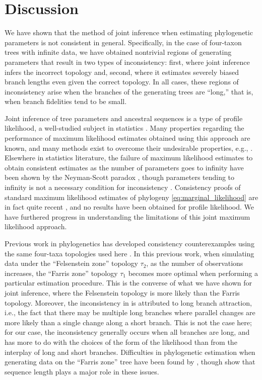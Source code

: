 \documentclass{article}
\begin{document}
\section*{Discussion}

We have shown that the method of joint inference when estimating phylogenetic parameters \cite{Sagulenko2017-jo} is not consistent in general.
Specifically, in the case of four-taxon trees with infinite data, we have obtained nontrivial regions of generating parameters that result in two types of inconsistency: first, where joint inference infers the incorrect topology and, second, where it estimates severely biased branch lengths even given the correct topology.
In all cases, these regions of inconsistency arise when the branches of the generating trees are ``long,'' that is, when branch fidelities tend to be small.

Joint inference of tree parameters and ancestral sequences is a type of profile likelihood, a well-studied subject in statistics \cite{Murphy2000-ry}.
Many properties regarding the performance of maximum likelihood estimates obtained using this approach are known, and many methods exist to overcome their undesirable properties, e.g., \cite{Geman1982}.
Elsewhere in statistics literature, the failure of maximum likelihood estimates to obtain consistent estimates as the number of parameters goes to infinity have been shown by the Neyman-Scott paradox \cite{Neyman1948-tt}, though parameters tending to infinity is not a necessary condition for inconsistency \cite{LeCam1990}.
Consistency proofs of standard maximum likelihood estimates of phylogeny \eqref{eq:marginal_likelihood} are in fact quite recent \cite{RoyChoudhury2015-ta}, and no results have been obtained for profile likelihood.
We have furthered progress in understanding the limitations of this joint maximum likelihood approach.

Previous work in phylogenetics has developed consistency counterexamples using the same four-taxa topologies used here \cite{Felsenstein1978-rr}.
In this previous work, when simulating data under the ``Felsenstein zone'' topology $\tau_2$, as the number of observations increases, the ``Farris zone'' topology $\tau_1$ becomes more optimal when performing a particular estimation procedure.
This is the converse of what we have shown for joint inference, where the Felsenstein topology is more likely than the Farris topology.
Moreover, the inconsistency in \cite{Felsenstein1978-rr} is attributed to long branch attraction, i.e., the fact that there may be multiple long branches where parallel changes are more likely than a single change along a short branch.
This is not the case here; for our case, the inconsistency generally occurs when all branches are long, and has more to do with the choices of the form of the likelihood than from the interplay of long and short branches.
Difficulties in phylogenetic estimation when generating data on the ``Farris zone'' tree have been found by \cite{Siddall1998-hq}, though \cite{Swofford2001-hr} show that sequence length plays a major role in these issues.
\end{document}
